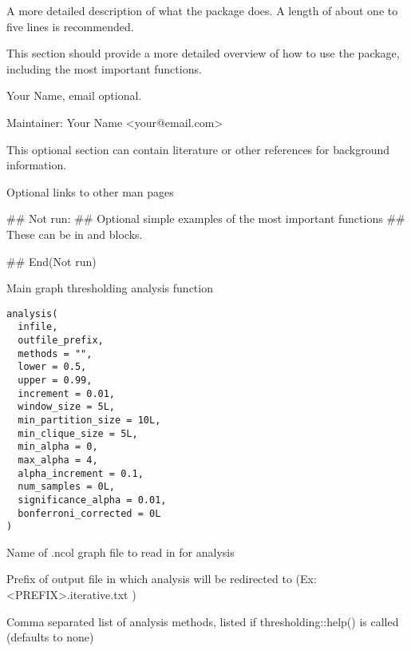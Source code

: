 \documentclass[a4paper]{book}
\begin{document}
%
\begin{Description}
A more detailed description of what the package does. A length
of about one to five lines is recommended.
\end{Description}
%
\begin{Details}
This section should provide a more detailed overview of how to use the
package, including the most important functions.
\end{Details}
%
\begin{Author}
Your Name, email optional.

Maintainer: Your Name <your@email.com>
\end{Author}
%
\begin{References}
This optional section can contain literature or other references for
background information.
\end{References}
%
\begin{SeeAlso}
Optional links to other man pages
\end{SeeAlso}
%
\begin{Examples}
\begin{ExampleCode}
  ## Not run: 
     ## Optional simple examples of the most important functions
     ## These can be in \dontrun{} and \donttest{} blocks.   
  
## End(Not run)
\end{ExampleCode}
\end{Examples}
%
\begin{Description}
Main graph thresholding analysis function
\end{Description}
%
\begin{Usage}
\begin{verbatim}
analysis(
  infile,
  outfile_prefix,
  methods = "",
  lower = 0.5,
  upper = 0.99,
  increment = 0.01,
  window_size = 5L,
  min_partition_size = 10L,
  min_clique_size = 5L,
  min_alpha = 0,
  max_alpha = 4,
  alpha_increment = 0.1,
  num_samples = 0L,
  significance_alpha = 0.01,
  bonferroni_corrected = 0L
)
\end{verbatim}
\end{Usage}
%
\begin{Arguments}
\begin{ldescription}
\item[\code{infile:}] Name of .ncol graph file to read in for analysis

\item[\code{outfile\_prefix:}] Prefix of output file in which analysis will be redirected to (Ex: <PREFIX>.iterative.txt )

\item[\code{methods:}] Comma separated list of analysis methods, listed if thresholding::help() is called (defaults to none)
\end{ldescription}
\end{Arguments}
\end{document}

